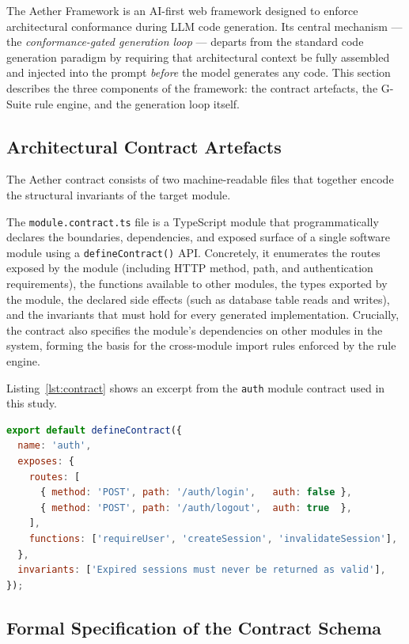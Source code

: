 \documentclass[review,12pt,3p]{elsarticle}
\begin{document}
The Aether Framework is an AI-first web framework designed to enforce architectural
conformance during LLM code generation. Its central mechanism --- the
\emph{conformance-gated generation loop} --- departs from the standard code generation
paradigm by requiring that architectural context be fully assembled and injected into the
prompt \emph{before} the model generates any code. This section describes the three
components of the framework: the contract artefacts, the G-Suite rule engine, and the
generation loop itself.

\subsection{Architectural Contract Artefacts}

The Aether contract consists of two machine-readable files that together encode the
structural invariants of the target module.

The \texttt{module.contract.ts} file is a TypeScript module that programmatically declares
the boundaries, dependencies, and exposed surface of a single software module using a
\texttt{defineContract()} API. Concretely, it enumerates the routes exposed by the module
(including HTTP method, path, and authentication requirements), the functions available to
other modules, the types exported by the module, the declared side effects (such as database
table reads and writes), and the invariants that must hold for every generated implementation.
Crucially, the contract also specifies the module's dependencies on other modules in the
system, forming the basis for the cross-module import rules enforced by the rule engine.


Listing~\ref{lst:contract} shows an excerpt from the \texttt{auth} module contract used
in this study.

\begin{lstlisting}[language=JavaScript, caption={Excerpt from \texttt{modules/auth/module.contract.ts}}, label=lst:contract, basicstyle=\small\ttfamily, frame=single, breaklines=true]
export default defineContract({
  name: 'auth',
  exposes: {
    routes: [
      { method: 'POST', path: '/auth/login',   auth: false },
      { method: 'POST', path: '/auth/logout',  auth: true  },
    ],
    functions: ['requireUser', 'createSession', 'invalidateSession'],
  },
  invariants: ['Expired sessions must never be returned as valid'],
});
\end{lstlisting}

\subsection{Formal Specification of the Contract Schema}
\label{sec:contract-schema}
\end{document}
